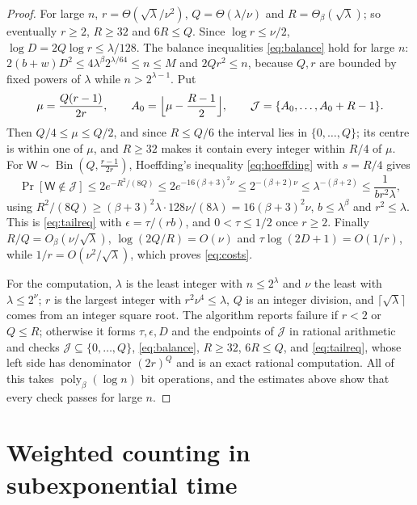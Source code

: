 \documentclass[11pt,reqno]{amsart}
\numberwithin{equation}{section}
\theoremstyle{plain}
\theoremstyle{definition}
\theoremstyle{remark}
\DeclareMathOperator{\Bin}{Bin}
\DeclareMathOperator{\poly}{poly}
\begin{document}
\begin{proof}
For large $n$, $r=\Theta(\sqrt\lambda/\nu^2)$, $Q=\Theta(\lambda/\nu)$ and
$R=\Theta_\beta(\sqrt\lambda)$; so eventually $r\ge2$, $R\ge32$ and $6R\le Q$.
Since $\log r\le\nu/2$, $\log D=2Q\log r\le\lambda/128$. The balance inequalities
\eqref{eq:balance} hold for large $n$: $2(b+w)D^2\le4\lambda^\beta2^{\lambda/64}\le n\le M$
and $2Qr^2\le n$, because $Q,r$ are bounded by fixed powers of $\lambda$ while
$n>2^{\lambda-1}$. Put
\[
  \mu=\frac{Q(r-1)}{2r},\qquad A_0=\Bigl\lfloor\mu-\frac{R-1}2\Bigr\rfloor,\qquad
  \mathcal J=\{A_0,\dots,A_0+R-1\}.
\]
Then $Q/4\le\mu\le Q/2$, and since $R\le Q/6$ the interval lies in
$\{0,\dots,Q\}$; its centre is within one of $\mu$, and $R\ge32$ makes it contain
every integer within $R/4$ of $\mu$. For $\mathsf W\sim\Bin(Q,\frac{r-1}{2r})$,
Hoeffding's inequality \eqref{eq:hoeffding} with $s=R/4$ gives
\[
  \Pr[\mathsf W\notin\mathcal J]\le2e^{-R^2/(8Q)}\le2e^{-16(\beta+3)^2\nu}
  \le2^{-(\beta+2)\nu}\le\lambda^{-(\beta+2)}\le\frac1{br^2\lambda},
\]
using $R^2/(8Q)\ge(\beta+3)^2\lambda\cdot128\nu/(8\lambda)=16(\beta+3)^2\nu$,
$b\le\lambda^\beta$ and $r^2\le\lambda$. This is \eqref{eq:tailreq} with
$\epsilon=\tau/(rb)$, and $0<\tau\le1/2$ once $r\ge2$. Finally
$R/Q=O_\beta(\nu/\sqrt\lambda)$, $\log(2Q/R)=O(\nu)$ and
$\tau\log(2D+1)=O(1/r)$, while $1/r=O(\nu^2/\sqrt\lambda)$, which proves
\eqref{eq:costs}.

For the computation, $\lambda$ is the least integer with $n\le2^\lambda$ and $\nu$
the least with $\lambda\le2^\nu$; $r$ is the largest integer with
$r^2\nu^4\le\lambda$, $Q$ is an integer division, and $\lceil\sqrt\lambda\rceil$
comes from an integer square root. The algorithm reports failure if $r<2$ or
$Q\le R$; otherwise it forms $\tau,\epsilon,D$ and the endpoints of $\mathcal J$
in rational arithmetic and checks $\mathcal J\subseteq\{0,\dots,Q\}$,
\eqref{eq:balance}, $R\ge32$, $6R\le Q$, and \eqref{eq:tailreq}, whose left side
has denominator $(2r)^Q$ and is an exact rational computation. All of this takes
$\poly_\beta(\log n)$ bit operations, and the estimates above show that every check
passes for large $n$.
\end{proof}

\section{Weighted counting in subexponential time}\label{sec:weighted}
\end{document}
